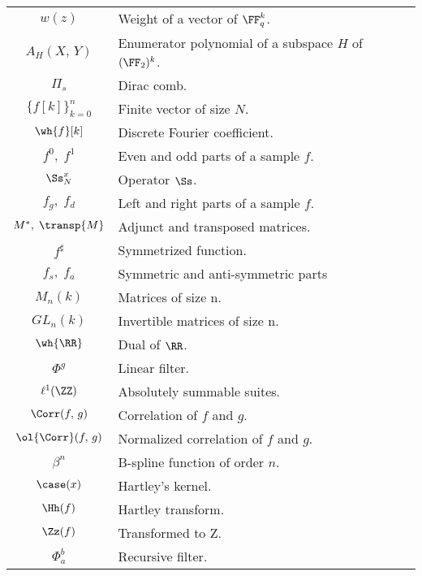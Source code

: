 \begin{center}
\begin{supertabular}{| c | p{9cm} | c |}
$ w (z) $ & Weight of a vector of $ \FF_q^k $. & \pageref{notation-39} \\[1mm]
$ A_H (X, \, Y) $ & Enumerator polynomial of a subspace $ H $ of $ (\FF_2)^k $. & \pageref{notation-40} \\[1mm]
$ \Pi_s $ & Dirac comb. & \pageref{notation-41} \\[1mm]
$ \{f [k]\}_{k = 0}^n $ & Finite vector of size $ N $. & \pageref{notation-42} \\[1mm]
$ \wh{f}[k] $ & Discrete Fourier coefficient. & \pageref{notation-43} \\[1mm]
$ f^0, \; f^1 $ & Even and odd parts of a sample $ f $. & \pageref{notation-44} \\[1mm]
$ \Ss_N^x $ & Operator $ \Ss $. & \pageref{notation-45} \\[1mm]
$ f_g, \; f_d $ & Left and right parts of a sample $ f $. & \pageref{notation-46} \\[1mm]
$ M^*, \; \transp{M} $ & Adjunct and transposed matrices. & \pageref{notation-47} \\[1mm]
$ f^\sharp $ & Symmetrized function. & \pageref{notation-48} \\[1mm]
$ f_{s}, \; f_{a} $ & Symmetric and anti-symmetric parts & \pageref{notation-49} \\[1mm]
$ M_n (k) $ & Matrices of size n. & \pageref{notation-50} \\[1mm]
$ GL_n (k) $ & Invertible matrices of size n. & \pageref{notation-51} \\[1mm]
$ \wh{\RR} $ & Dual of $ \RR $. & \pageref{notation-52} \\[1mm]
$ \Phi^g $ & Linear filter. & \pageref{notation-53} \\[1mm]
$ \ell^1 (\ZZ) $ & Absolutely summable suites. & \pageref{notation-54} \\[1mm]
$ \Corr (f, \, g) $ & Correlation of $ f $ and $ g $. & \pageref{notation-55} \\[1mm]
$ \ol{\Corr} (f, \, g) $ & Normalized correlation of $ f $ and $ g $. & \pageref{notation-56} \\[1mm]
$ \beta^n $ & B-spline function of order $ n $. & \pageref{notation-57} \\[1mm]
$ \case (x) $ & Hartley's kernel. & \pageref{notation-58} \\[1mm]
$ \Hh (f) $ & Hartley transform. & \pageref{notation-59} \\[1mm]
$ \Zz (f) $ & Transformed to Z. & \pageref{notation-60} \\[1mm]
$ \Phi_a^b $ & Recursive filter. & \pageref{notation-61} \\[1mm]

\end{supertabular}
\end{center}
